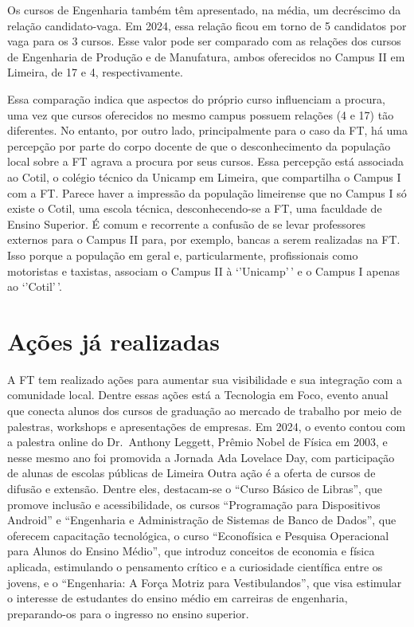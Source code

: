 \documentclass[
  letterpaper,
  DIV=11,
  numbers=noendperiod]{scrreprt}
\begin{document}
Os cursos de Engenharia também têm apresentado, na média, um decréscimo
da relação candidato-vaga. Em 2024, essa relação ficou em torno de 5
candidatos por vaga para os 3 cursos. Esse valor pode ser comparado com
as relações dos cursos de Engenharia de Produção e de Manufatura, ambos
oferecidos no Campus II em Limeira, de 17 e 4, respectivamente.

Essa comparação indica que aspectos do próprio curso influenciam a
procura, uma vez que cursos oferecidos no mesmo campus possuem relações
(4 e 17) tão diferentes. No entanto, por outro lado, principalmente para
o caso da FT, há uma percepção por parte do corpo docente de que o
desconhecimento da população local sobre a FT agrava a procura por seus
cursos. Essa percepção está associada ao Cotil, o colégio técnico da
Unicamp em Limeira, que compartilha o Campus I com a FT. Parece haver a
impressão da população limeirense que no Campus I só existe o Cotil, uma
escola técnica, desconhecendo-se a FT, uma faculdade de Ensino Superior.
É comum e recorrente a confusão de se levar professores externos para o
Campus II para, por exemplo, bancas a serem realizadas na FT. Isso
porque a população em geral e, particularmente, profissionais como
motoristas e taxistas, associam o Campus II à `'Unicamp'\,' e o Campus I
apenas ao `'Cotil'\,'.

\section{Ações já realizadas}\label{auxe7uxf5es-juxe1-realizadas}

A FT tem realizado ações para aumentar sua visibilidade e sua integração
com a comunidade local. Dentre essas ações está a Tecnologia em Foco,
evento anual que conecta alunos dos cursos de graduação ao mercado de
trabalho por meio de palestras, workshops e apresentações de empresas.
Em 2024, o evento contou com a palestra online do Dr.~Anthony Leggett,
Prêmio Nobel de Física em 2003, e nesse mesmo ano foi promovida a
Jornada Ada Lovelace Day, com participação de alunas de escolas públicas
de Limeira Outra ação é a oferta de cursos de difusão e extensão. Dentre
eles, destacam-se o ``Curso Básico de Libras'', que promove inclusão e
acessibilidade, os cursos ``Programação para Dispositivos Android'' e
``Engenharia e Administração de Sistemas de Banco de Dados'', que
oferecem capacitação tecnológica, o curso ``Econofísica e Pesquisa
Operacional para Alunos do Ensino Médio'', que introduz conceitos de
economia e física aplicada, estimulando o pensamento crítico e a
curiosidade científica entre os jovens, e o ``Engenharia: A Força Motriz
para Vestibulandos'', que visa estimular o interesse de estudantes do
ensino médio em carreiras de engenharia, preparando-os para o ingresso
no ensino superior.
\end{document}
